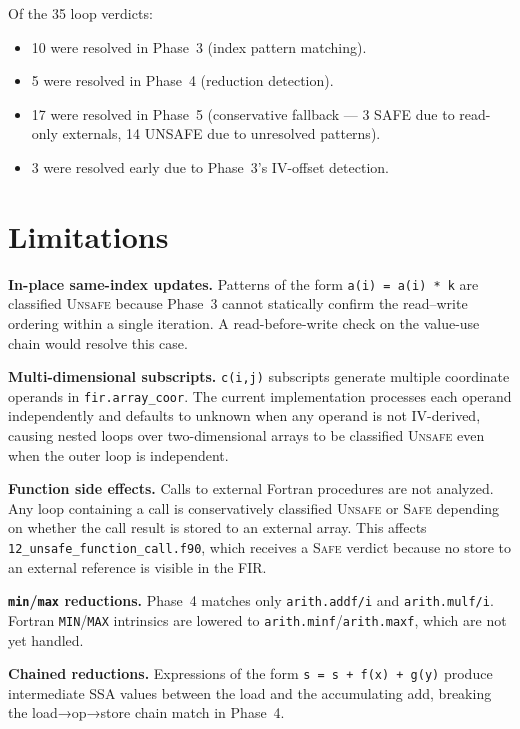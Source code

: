\documentclass[conference]{IEEEtran}
\begin{document}
Of the 35 loop verdicts:
\begin{itemize}
  \item 10 were resolved in Phase~3 (index pattern matching).
  \item 5 were resolved in Phase~4 (reduction detection).
  \item 17 were resolved in Phase~5 (conservative fallback — 3 SAFE
        due to read-only externals, 14 UNSAFE due to unresolved
        patterns).
  \item 3 were resolved early due to Phase~3's IV-offset detection.
\end{itemize}

\section{Limitations}
\label{sec:limitations}

\textbf{In-place same-index updates.}
Patterns of the form \texttt{a(i) = a(i) * k} are classified
\textsc{Unsafe} because Phase~3 cannot statically confirm the
read–write ordering within a single iteration.  A read-before-write
check on the value-use chain would resolve this case.

\textbf{Multi-dimensional subscripts.}
\texttt{c(i,j)} subscripts generate multiple coordinate operands in
\texttt{fir.array\_coor}.  The current implementation processes each
operand independently and defaults to unknown when any operand is not
IV-derived, causing nested loops over two-dimensional arrays to be
classified \textsc{Unsafe} even when the outer loop is independent.

\textbf{Function side effects.}
Calls to external Fortran procedures are not analyzed.  Any loop
containing a call is conservatively classified \textsc{Unsafe} or
\textsc{Safe} depending on whether the call result is stored to an
external array.  This affects \texttt{12\_unsafe\_function\_call.f90},
which receives a \textsc{Safe} verdict because no store to an external
reference is visible in the FIR.

\textbf{\texttt{min}/\texttt{max} reductions.}
Phase~4 matches only \texttt{arith.addf/i} and \texttt{arith.mulf/i}.
Fortran \texttt{MIN}/\texttt{MAX} intrinsics are lowered to
\texttt{arith.minf}/\texttt{arith.maxf}, which are not yet handled.

\textbf{Chained reductions.}
Expressions of the form \texttt{s = s + f(x) + g(y)} produce
intermediate SSA values between the load and the accumulating add,
breaking the load→op→store chain match in Phase~4.
\end{document}
